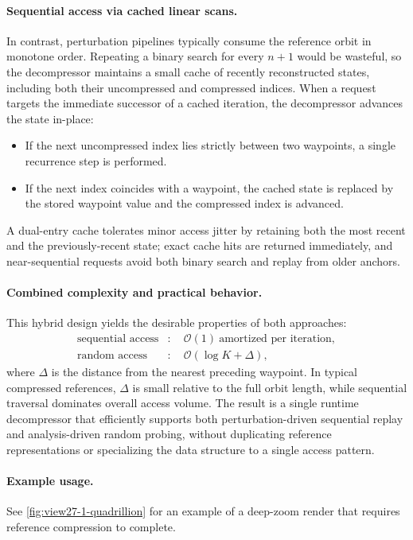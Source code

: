 \paragraph{Sequential access via cached linear scans.}
In contrast, perturbation pipelines typically consume the reference orbit in
monotone order.  Repeating a binary search for every \(n+1\) would be wasteful,
so the decompressor maintains a small cache of recently reconstructed states,
including both their uncompressed and compressed indices.  When a request
targets the immediate successor of a cached iteration, the decompressor advances
the state in-place:
\begin{itemize}
  \item If the next uncompressed index lies strictly between two waypoints, a
        single recurrence step is performed.
  \item If the next index coincides with a waypoint, the cached state is replaced
        by the stored waypoint value and the compressed index is advanced.
\end{itemize}
A dual-entry cache tolerates minor access jitter by retaining both the most
recent and the previously-recent state; exact cache hits are returned
immediately, and near-sequential requests avoid both binary search and replay
from older anchors.

\paragraph{Combined complexity and practical behavior.}
This hybrid design yields the desirable properties of both approaches:
\begin{align}
  \text{sequential access} &: \quad \mathcal{O}(1)\ \text{amortized per iteration}, \label{eq:sequential-complexity} \\
  \text{random access} &: \quad \mathcal{O}(\log K + \Delta), \label{eq:random-access-complexity}
\end{align}
where \(\Delta\) is the distance from the nearest preceding waypoint.  In typical
compressed references, \(\Delta\) is small relative to the full orbit length,
while sequential traversal dominates overall access volume.  The result is a
single runtime decompressor that efficiently supports both perturbation-driven
sequential replay and analysis-driven random probing, without duplicating
reference representations or specializing the data structure to a single access
pattern.

\paragraph{Example usage.}
See \cref{fig:view27-1-quadrillion} for an example of a deep-zoom render
that requires reference compression to complete.

